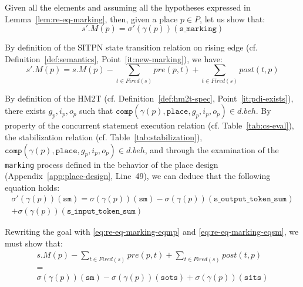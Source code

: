 \begin{pf}
  Given all the elements and assuming all the hypotheses expressed in
  Lemma~\ref{lem:re-eq-marking}, then, given a place $p\in{}P$, let us
  show that:
  \begin{equation*}
    \boxed{s'.M(p)=\sigma'(\gamma(p))(\texttt{s\_marking})}
  \end{equation*}

  By definition of the SITPN state transition relation on rising edge
  (cf. Definition~\ref{def:semantics}, Point~\ref{it:new-marking}), we
  have:
  \begin{equation}\label{eq:re-eq-marking-eqmp}
    s'.M(p)=s.M(p)-\sum\limits_{t\in{}Fired(s)}pre(p,t)+\sum\limits_{t\in{}Fired(s)}post(t,p)
  \end{equation}

  \bigskip
  
  By definition of the HM2T (cf. Definition~\ref{def:hm2t-spec},
  Point~\ref{it:pdi-exists}), there exists $g_p,i_p,o_p$ such that
  $\mathtt{comp}(\gamma(p),\mathtt{place},g_p,i_p,o_p)\in{}d.beh$.  By
  property of the \hvhdl{} concurrent statement execution relation
  (cf. Table~\ref{tab:cs-eval}), the stabilization relation
  (cf. Table~\ref{tab:stabilization}),
  $\mathtt{comp}(\gamma(p),\mathtt{place},g_p,i_p,o_p)\in{}d.beh$, and
  through the examination of the \texttt{marking} process defined in
  the behavior of the place design (Appendix~\ref{app:place-design},
  Line~49), we can deduce that the following equation holds:
  \begin{equation}\label{eq:re-eq-marking-eqsm}
    \begin{split}
      \sigma'(\gamma(p))(\texttt{sm})=\sigma(\gamma(p))(\texttt{sm})-\sigma(\gamma(p))(\texttt{s\_output\_token\_sum})\\
      +\sigma(\gamma(p))(\texttt{s\_input\_token\_sum})
    \end{split}
  \end{equation}

  \bigskip
  
  \noindent{}Rewriting the goal with \eqref{eq:re-eq-marking-eqmp} and
  \eqref{eq:re-eq-marking-eqsm}, we must show that:
  \begin{equation*}
    \boxed{
      \begin{array}{c}
      s.M(p)-\sum\limits_{t\in{}Fired(s)}pre(p,t)+\sum\limits_{t\in{}Fired(s)}post(t,p)\\
      = \\
      \sigma(\gamma(p))(\texttt{sm})-\sigma(\gamma(p))(\texttt{sots})
      +\sigma(\gamma(p))(\texttt{sits}) \\
      \end{array}}
  \end{equation*}
  

\end{pf}
